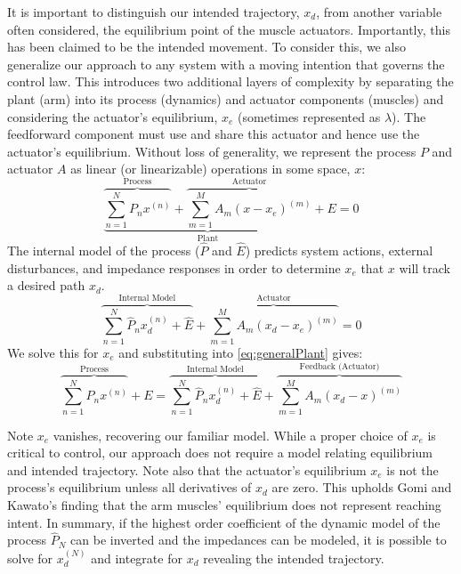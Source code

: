 \documentclass[10pt]{article}
\begin{document}
It is important to distinguish our intended trajectory, $x_d$, from another variable often considered, the equilibrium point of the muscle actuators. Importantly, this has been claimed to be the intended movement. To consider this, we also generalize our approach to any system with a moving intention that governs the control law. This introduces two additional layers of complexity by separating the plant (arm) into its process (dynamics) and actuator components (muscles) and considering the actuator's equilibrium, $x_e$ (sometimes represented as $\lambda$). The feedforward component must use and share this actuator and hence use the actuator's equilibrium. Without loss of generality, we represent the process $P$ and actuator $A$ as linear (or linearizable) operations in some space, $x$:
\begin{equation} \label{eq:generalPlant}
\underbrace{\overbrace{\sum_{n=1}^N P_nx^{(n)}}^\text{Process}+\overbrace{\sum_{m=1}^M A_m(x-x_e)^{(m)}}^\text{Actuator}}_\text{Plant}+E=0
\end{equation}
The internal model of the process ($\hat{P}$ and $\hat{E}$) predicts system actions, external disturbances, and impedance responses in order to determine $x_e$ that $x$ will track a desired path $x_d$.    
\begin{equation}
\overbrace{\sum_{n=1}^N \hat{P}_n x^{(n)}_d+\hat{E}}^\text{Internal Model}+\overbrace{\sum_{m=1}^M A_m(x_d-x_e)^{(m)}}^\text{Actuator}=0
\end{equation}
We solve this for $x_e$ and substituting into \eqref{eq:generalPlant} gives:
\begin{equation}
\overbrace{\sum_{n=1}^N P_nx^{(n)}}^\text{Process}+E=\overbrace{\sum_{n=1}^N \hat{P}_n x^{(n)}_d+\hat{E}}^\text{Internal Model}+\overbrace{\sum_{m=1}^M A_m (x_d-x)^{(m)}}^\text{Feedback (Actuator)}
\end{equation}

Note $x_e$ vanishes, recovering our familiar model. While a proper choice of $x_e$ is critical to control, our approach does not require a model relating equilibrium and intended trajectory. Note also that the actuator's equilibrium $x_e$ is not the process's equilibrium unless all derivatives of $x_d$ are zero. This upholds Gomi and Kawato's finding that the arm muscles' equilibrium does not represent reaching intent\cite{gomi1997human}. In summary, if the highest order coefficient of the dynamic model of the process $\hat{P}_N$ can be inverted and the impedances can be modeled, it is possible to solve for $x_d^{(N)}$ and integrate for $x_d$ revealing the intended trajectory.
\end{document}
